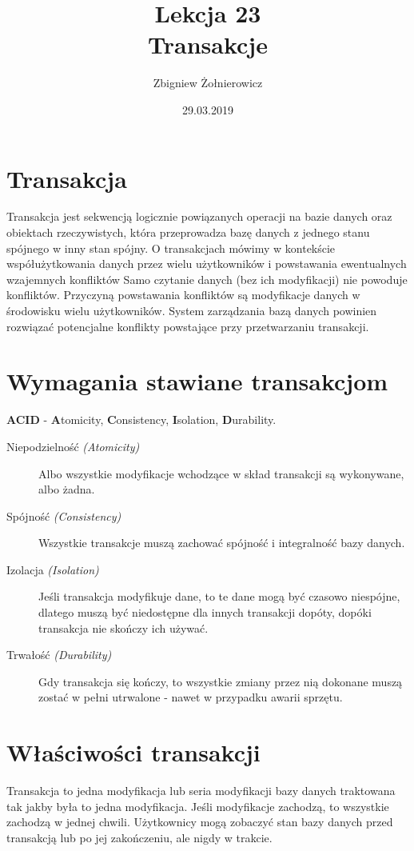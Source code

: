 \documentclass[a4paper]{article}
\begin{document}
\title{{\huge Lekcja 23} \\
{\large Transakcje}}
\author{Zbigniew Żołnierowicz}
\date{29.03.2019}
\maketitle
\section{Transakcja}
Transakcja jest sekwencją logicznie powiązanych operacji na bazie danych oraz obiektach rzeczywistych,
która przeprowadza bazę danych z jednego stanu spójnego w inny stan spójny.
O transakcjach mówimy w kontekście współużytkowania danych przez wielu użytkowników i powstawania ewentualnych wzajemnych konfliktów
Samo czytanie danych (bez ich modyfikacji) nie powoduje konfliktów.
Przyczyną powstawania konfliktów są modyfikacje danych w środowisku wielu użytkowników.
System zarządzania bazą danych powinien rozwiązać potencjalne konflikty powstające przy przetwarzaniu transakcji.
\section{Wymagania stawiane transakcjom}
\Large{\textbf{ACID} - \textbf{A}tomicity, \textbf{C}onsistency, \textbf{I}solation, \textbf{D}urability.}
\normalsize
\begin{description}
    \item[Niepodzielność {\em (Atomicity)}] Albo wszystkie modyfikacje wchodzące w skład transakcji są wykonywane, albo żadna.
    \item[Spójność {\em (Consistency)}] Wszystkie transakcje muszą zachować spójność i integralność bazy danych.
    \item[Izolacja {\em (Isolation)}] Jeśli transakcja modyfikuje dane, to te dane mogą być czasowo niespójne, dlatego muszą być niedostępne dla innych transakcji dopóty, dopóki transakcja nie skończy ich używać.
    \item[Trwałość {\em (Durability)}] Gdy transakcja się kończy, to wszystkie zmiany przez nią dokonane muszą zostać w pełni utrwalone - nawet w przypadku awarii sprzętu.
\end{description}
\pagebreak
\section{Właściwości transakcji}
Transakcja to jedna modyfikacja lub seria modyfikacji bazy danych traktowana tak jakby była to jedna modyfikacja.
Jeśli modyfikacje zachodzą, to wszystkie zachodzą w jednej chwili.
Użytkownicy mogą zobaczyć stan bazy danych przed transakcją lub po jej zakończeniu, ale nigdy w trakcie.
\end{document}
